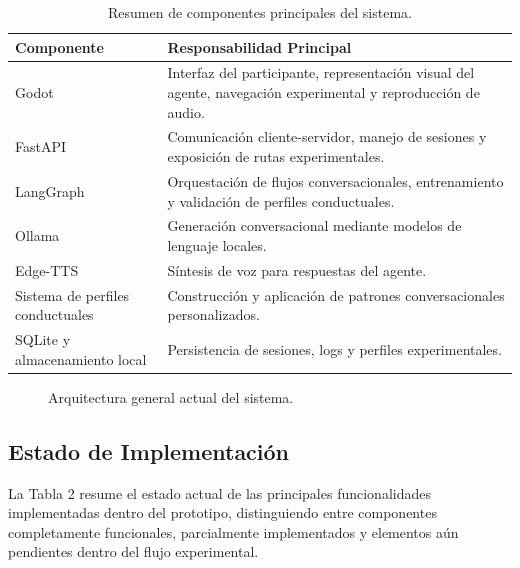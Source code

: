 \documentclass[12pt]{article}
\begin{document}
\begin{table}[H]
\centering
\small
\renewcommand{\arraystretch}{1.2}

\begin{tabular}{p{4cm} p{9cm}}
\toprule
\textbf{Componente} & \textbf{Responsabilidad Principal} \\
\midrule

Godot
& Interfaz del participante, representación visual del agente, navegación experimental y reproducción de audio. \\

FastAPI
& Comunicación cliente-servidor, manejo de sesiones y exposición de rutas experimentales. \\

LangGraph
& Orquestación de flujos conversacionales, entrenamiento y validación de perfiles conductuales. \\

Ollama
& Generación conversacional mediante modelos de lenguaje locales. \\

Edge-TTS
& Síntesis de voz para respuestas del agente. \\

Sistema de perfiles conductuales
& Construcción y aplicación de patrones conversacionales personalizados. \\

SQLite y almacenamiento local
& Persistencia de sesiones, logs y perfiles experimentales. \\

\bottomrule
\end{tabular}

\caption{Resumen de componentes principales del sistema.}

\end{table}

\begin{figure}[H]
    \centering
    \caption{Arquitectura general actual del sistema.}
\end{figure}

\subsection{Estado de Implementación}

La Tabla 2 resume el estado actual de las principales funcionalidades implementadas dentro del prototipo, distinguiendo entre componentes completamente funcionales, parcialmente implementados y elementos aún pendientes dentro del flujo experimental.
\end{document}
